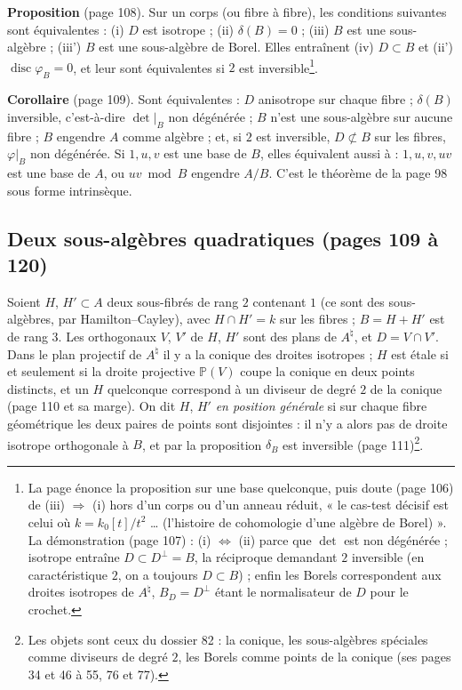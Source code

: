 \documentclass[11pt,a4paper]{article}
\begin{document}
\textbf{Proposition} (page 108). Sur un corps (ou fibre à fibre), les
conditions suivantes sont équivalentes : (i) $D$ est isotrope ; (ii) $\delta(B)
= 0$ ; (iii) $B$ est une sous-algèbre ; (iii') $B$ est une sous-algèbre de
Borel. Elles entraînent (iv) $D \subset B$ et (ii') $\operatorname{disc}\varphi_B
= 0$, et leur sont équivalentes si $2$ est inversible\footnote{La page énonce
la proposition sur une base quelconque, puis doute (page 106) de (iii)
$\Rightarrow$ (i) hors d'un corps ou d'un anneau réduit, « le cas-test décisif
est celui où $k = k_0[t]/t^2$ … (l'histoire de cohomologie d'une algèbre de
Borel) ». La démonstration (page 107) : (i) $\Leftrightarrow$ (ii) parce que
$\det$ est non dégénérée ; isotrope entraîne $D \subset D^{\perp} = B$, la
réciproque demandant $2$ inversible (en caractéristique $2$, on a toujours $D
\subset B$) ; enfin les Borels correspondent aux droites isotropes de
$A^{\natural}$, $B_D = D^{\perp}$ étant le normalisateur de $D$ pour le
crochet.}.

\textbf{Corollaire} (page 109). Sont équivalentes : $D$ anisotrope sur chaque
fibre ; $\delta(B)$ inversible, c'est-à-dire $\det|_B$ non dégénérée ; $B$
n'est une sous-algèbre sur aucune fibre ; $B$ engendre $A$ comme algèbre ; et,
si $2$ est inversible, $D \not\subset B$ sur les fibres, $\varphi|_B$ non
dégénérée. Si $1, u, v$ est une base de $B$, elles équivalent aussi à : $1, u,
v, uv$ est une base de $A$, ou $uv \bmod B$ engendre $A/B$. C'est le théorème
de la page 98 sous forme intrinsèque.

\subsection*{Deux sous-algèbres quadratiques (pages 109 à 120)}

Soient $H$, $H' \subset A$ deux sous-fibrés de rang $2$ contenant $1$ (ce sont
des sous-algèbres, par Hamilton--Cayley), avec $H \cap H' = k$ sur les fibres ;
$B = H + H'$ est de rang $3$. Les orthogonaux $V$, $V'$ de $H$, $H'$ sont des
plans de $A^{\natural}$, et $D = V \cap V'$. Dans le plan projectif de
$A^{\natural}$ il y a la conique des droites isotropes ; $H$ est étale si et
seulement si la droite projective $\mathbb{P}(V)$ coupe la conique en deux points
distincts, et un $H$ quelconque correspond à un diviseur de degré $2$ de la
conique (page 110 et sa marge). On dit $H$, $H'$ \emph{en position générale}
si sur chaque fibre géométrique les deux paires de points sont disjointes :
il n'y a alors pas de droite isotrope orthogonale à $B$, et par la proposition
$\delta_B$ est inversible (page 111)\footnote{Les objets sont ceux du dossier
82 : la conique, les sous-algèbres spéciales comme diviseurs de degré $2$, les
Borels comme points de la conique (ses pages 34 et 46 à 55, 76 et 77).}.
\end{document}
